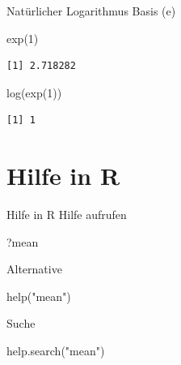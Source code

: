 \documentclass[
  10pt,
  ignorenonframetext,
  aspectratio=169,
]{beamer}
\newenvironment{Shaded}{}{}
\newcommand{\DecValTok}[1]{\textcolor[rgb]{0.25,0.63,0.44}{#1}}
\newcommand{\FunctionTok}[1]{\textcolor[rgb]{0.02,0.16,0.49}{#1}}
\newcommand{\NormalTok}[1]{#1}
\newcommand{\StringTok}[1]{\textcolor[rgb]{0.25,0.44,0.63}{#1}}
\begin{document}
\begin{frame}[fragile]{Natürlicher Logarithmus}
\label{natuxfcrlicher-logarithmus}
Basis (e)

\begin{Shaded}
\begin{Highlighting}[]
\FunctionTok{exp}\NormalTok{(}\DecValTok{1}\NormalTok{)}
\end{Highlighting}
\end{Shaded}

\begin{verbatim}
[1] 2.718282
\end{verbatim}

\begin{Shaded}
\begin{Highlighting}[]
\FunctionTok{log}\NormalTok{(}\FunctionTok{exp}\NormalTok{(}\DecValTok{1}\NormalTok{))}
\end{Highlighting}
\end{Shaded}

\begin{verbatim}
[1] 1
\end{verbatim}
\end{frame}

\begin{frame}
\end{frame}

\section{Hilfe in R}\label{hilfe-in-r}

\begin{frame}[fragile]{Hilfe in R}
\label{hilfe-in-r-1}
Hilfe aufrufen

\begin{Shaded}
\begin{Highlighting}[]
\NormalTok{?mean}
\end{Highlighting}
\end{Shaded}

Alternative

\begin{Shaded}
\begin{Highlighting}[]
\FunctionTok{help}\NormalTok{(}\StringTok{"mean"}\NormalTok{)}
\end{Highlighting}
\end{Shaded}

Suche

\begin{Shaded}
\begin{Highlighting}[]
\FunctionTok{help.search}\NormalTok{(}\StringTok{"mean"}\NormalTok{)}
\end{Highlighting}
\end{Shaded}
\end{frame}
\end{document}
